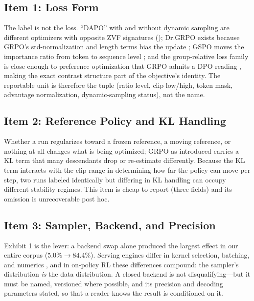\subsection{Item 1: Loss Form}
\label{sec:p5-item1}
The label is not the loss. ``DAPO'' with and without dynamic sampling are
different optimizers with opposite ZVF signatures
(); Dr.GRPO exists because GRPO's
std-normalization and length terms bias the update \citep{tong2025drgrpo};
GSPO moves the importance ratio from token to sequence level
\citep{qwen2025gspo}; and the group-relative loss family is close enough to
preference optimization that GRPO admits a DPO reading
\citep{rafailov2024direct, wu2025grpo_dpo}, making the exact contrast structure
part of the objective's identity. The reportable unit is therefore the tuple
(ratio level, clip low/high, token mask, advantage normalization,
dynamic-sampling status), not the name.

\subsection{Item 2: Reference Policy and KL Handling}
\label{sec:p5-item2}
Whether a run regularizes toward a frozen reference, a moving reference, or
nothing at all changes what is being optimized; GRPO as introduced carries a
KL term \citep{shao2024deepseekmath} that many descendants drop or re-estimate
differently. Because the KL term interacts with the clip range in determining
how far the policy can move per step, two runs labeled identically but
differing in KL handling can occupy different stability regimes. This item is
cheap to report (three fields) and its omission is unrecoverable post hoc.

\subsection{Item 3: Sampler, Backend, and Precision}
\label{sec:p5-item3}
Exhibit 1 is the lever: a backend swap alone produced the largest effect in
our entire corpus ($5.0\% \to 84.4\%$). Serving engines differ in kernel
selection, batching, and numerics \citep{kwon2023vllm, zheng2024sglang,
dao2022flashattention}, and in on-policy RL these differences compound: the
sampler's distribution \emph{is} the data distribution. A closed backend is
not disqualifying---but it must be named, versioned where possible, and its
precision and decoding parameters stated, so that a reader knows the result is
conditioned on it.


